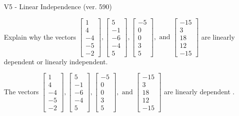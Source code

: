 \begin{exercise}
  \begin{exerciseTitle}V5 - Linear Independence (ver. 590)\end{exerciseTitle}
  \begin{exerciseStatement}
    Explain why the vectors \(\left[\begin{array}{r}
1 \\
4 \\
-4 \\
-5 \\
-2
\end{array}\right] , \left[\begin{array}{r}
5 \\
-1 \\
-6 \\
-4 \\
5
\end{array}\right] , \left[\begin{array}{r}
-5 \\
0 \\
0 \\
3 \\
5
\end{array}\right] , \text{ and } \left[\begin{array}{r}
-15 \\
3 \\
18 \\
12 \\
-15
\end{array}\right]\) are linearly dependent or linearly independent.	


  \end{exerciseStatement}
  \begin{exerciseAnswer}
   The vectors \(\left[\begin{array}{r}
1 \\
4 \\
-4 \\
-5 \\
-2
\end{array}\right] , \left[\begin{array}{r}
5 \\
-1 \\
-6 \\
-4 \\
5
\end{array}\right] , \left[\begin{array}{r}
-5 \\
0 \\
0 \\
3 \\
5
\end{array}\right] , \text{ and } \left[\begin{array}{r}
-15 \\
3 \\
18 \\
12 \\
-15
\end{array}\right]\) are 
  	 linearly dependent  .
  


  \end{exerciseAnswer}
\end{exercise}